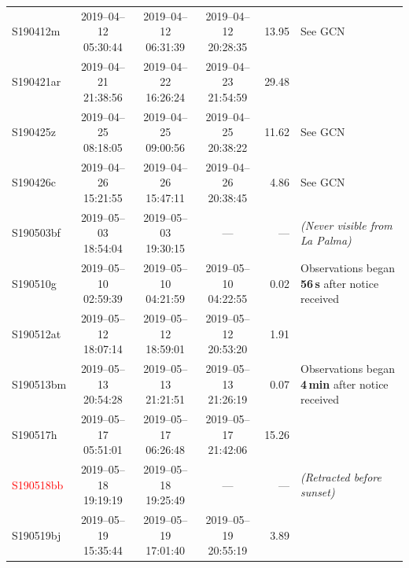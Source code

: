 \begin{colsection}
\begin{colsection}
\begin{table}
\begin{footnotesize}
\begin{center}
\begin{tabular}{l|cccrl}
            \\
            S190412m &
            2019--04--12 05:30:44 &
            2019--04--12 06:31:39 &
            2019--04--12 20:28:35 &
            13.95 &
            See GCN \citet{GW190412_GOTO}
            \\
            S190421ar &
            2019--04--21 21:38:56 &
            2019--04--22 16:26:24 &
            2019--04--23 21:54:59 &
            29.48 &

            \\
            S190425z &
            2019--04--25 08:18:05 &
            2019--04--25 09:00:56 &
            2019--04--25 20:38:22 &
            11.62 &
            See GCN \citet{GW190425_GOTO}
            \\
            S190426c &
            2019--04--26 15:21:55 &
            2019--04--26 15:47:11 &
            2019--04--26 20:38:45 &
            4.86 &
            See GCN \citet{GW190426_GOTO}
            \\
            S190503bf &
            2019--05--03 18:54:04 &
            2019--05--03 19:30:15 &
            --- &
            --- &
            \textit{(Never visible from La Palma)}
            \\
            S190510g &
            2019--05--10 02:59:39 &
            2019--05--10 04:21:59 &
            2019--05--10 04:22:55 &
            0.02 &
            Observations began \textbf{56\,s} after notice received
            \\
            S190512at &
            2019--05--12 18:07:14 &
            2019--05--12 18:59:01 &
            2019--05--12 20:53:20 &
            1.91 &

            \\
            S190513bm &
            2019--05--13 20:54:28 &
            2019--05--13 21:21:51 &
            2019--05--13 21:26:19 &
            0.07 &
            Observations began \textbf{4\,min} after notice received
            \\
            S190517h &
            2019--05--17 05:51:01 &
            2019--05--17 06:26:48 &
            2019--05--17 21:42:06 &
            15.26 &

            \\
            \textcolor{Red}{S190518bb} &
            2019--05--18 19:19:19 &
            2019--05--18 19:25:49 &
            --- &
            --- &
            \textit{(Retracted before sunset)}
            \\
            S190519bj &
            2019--05--19 15:35:44 &
            2019--05--19 17:01:40 &
            2019--05--19 20:55:19 &
            3.89 &


\end{tabular}
\end{center}
\end{footnotesize}
\end{table}
\end{colsection}
\end{colsection}
